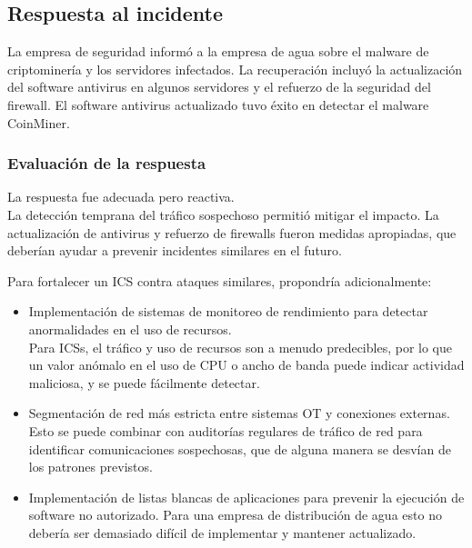 \subsection{Respuesta al incidente}
La empresa de seguridad informó a la empresa de agua sobre el malware de criptominería y los servidores infectados. La recuperación incluyó la actualización del software antivirus en algunos servidores y el refuerzo de la seguridad del firewall. El software antivirus actualizado tuvo éxito en detectar el malware CoinMiner.

\subsubsection{Evaluación de la respuesta}
La respuesta fue adecuada pero reactiva.\\
La detección temprana del tráfico sospechoso permitió mitigar el impacto.
La actualización de antivirus y refuerzo de firewalls fueron medidas apropiadas, que deberían ayudar a prevenir incidentes similares en el futuro.

Para fortalecer un ICS contra ataques similares, propondría adicionalmente:
\begin{itemize}
    \item Implementación de sistemas de monitoreo de rendimiento para detectar anormalidades en el uso de recursos.\\
        Para ICSs, el tráfico y uso de recursos son a menudo predecibles, por lo que un valor anómalo en el uso de CPU o ancho de banda puede indicar actividad maliciosa, y se puede fácilmente detectar.
        \item Segmentación de red más estricta entre sistemas OT y conexiones externas.
        Esto se puede combinar con auditorías regulares de tráfico de red para identificar comunicaciones sospechosas, que de alguna manera se desvían de los patrones previstos.
        \item Implementación de listas blancas de aplicaciones para prevenir la ejecución de software no autorizado.
        Para una empresa de distribución de agua esto no debería ser demasiado difícil de implementar y mantener actualizado.
\end{itemize}


